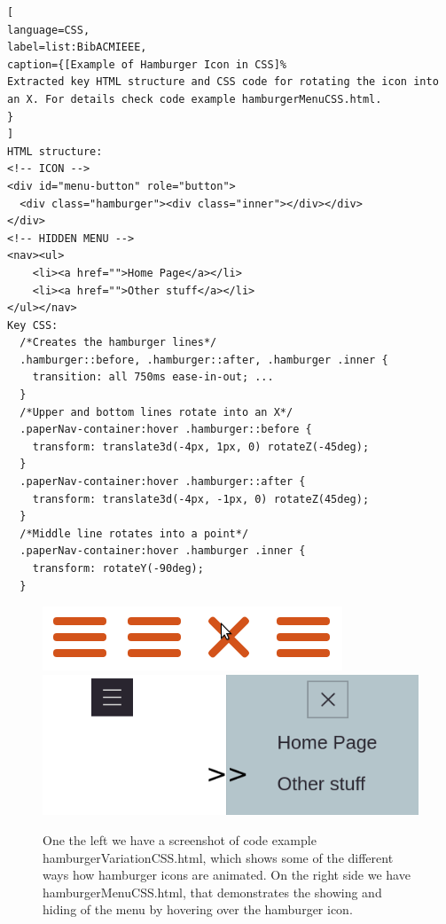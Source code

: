 \begin{lstlisting}[
language=CSS,
label=list:BibACMIEEE,
caption={[Example of Hamburger Icon in CSS]%
Extracted key HTML structure and CSS code for rotating the icon into an X. For details check code example hamburgerMenuCSS.html.
}
]
HTML structure:
<!-- ICON -->
<div id="menu-button" role="button">
  <div class="hamburger"><div class="inner"></div></div>
</div>
<!-- HIDDEN MENU -->
<nav><ul>
    <li><a href="">Home Page</a></li>
    <li><a href="">Other stuff</a></li>
</ul></nav>
Key CSS:
  /*Creates the hamburger lines*/
  .hamburger::before, .hamburger::after, .hamburger .inner {
    transition: all 750ms ease-in-out; ...
  }
  /*Upper and bottom lines rotate into an X*/
  .paperNav-container:hover .hamburger::before {
    transform: translate3d(-4px, 1px, 0) rotateZ(-45deg);  
  }
  .paperNav-container:hover .hamburger::after {
    transform: translate3d(-4px, -1px, 0) rotateZ(45deg);  
  }
  /*Middle line rotates into a point*/
  .paperNav-container:hover .hamburger .inner {
    transform: rotateY(-90deg); 
  }\end{lstlisting}
\label{list:hamburger}

\begin{figure}[h]
\centering
\includegraphics[keepaspectratio,scale=0.5]{images/hamburgerVar.png}
\includegraphics[keepaspectratio,scale=0.5]{images/hamburgerMenu.png}

\caption[Hamburger Examples]{
One the left we have a screenshot of code example hamburgerVariationCSS.html, which shows some of the different ways how hamburger icons are animated. On the right side we have hamburgerMenuCSS.html, that demonstrates the showing and hiding of the menu by hovering over the hamburger icon.
}
\label{fig:hamburger}
\end{figure}



